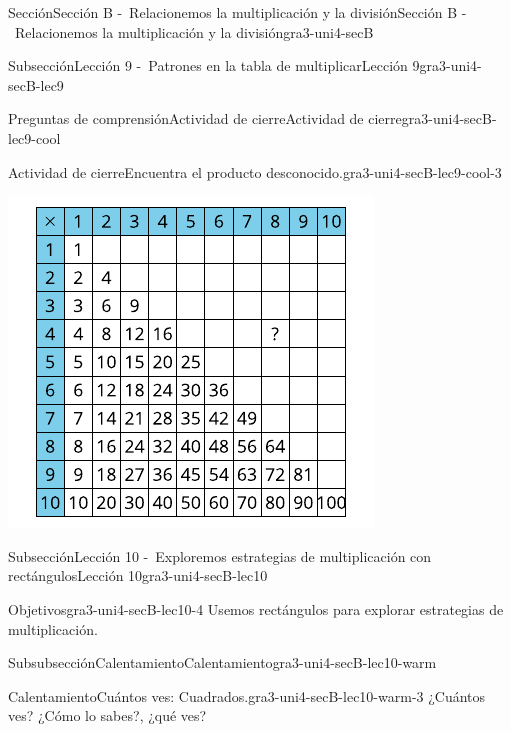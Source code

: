 \documentclass[twoside,10pt,]{article}
\begin{document}
\begin{sectionptx}{Sección}{Sección B -~Relacionemos la multiplicación y la división}{}{Sección B -~Relacionemos la multiplicación y la división}{}{}{gra3-uni4-secB}
\begin{subsectionptx}{Subsección}{Lección 9 -~Patrones en la tabla de multiplicar}{}{Lección 9}{}{}{gra3-uni4-secB-lec9}
\begin{reading-questions-subsubsection}{Preguntas de comprensión}{Actividad de cierre}{}{Actividad de cierre}{}{}{gra3-uni4-secB-lec9-cool}
\begin{project}{Actividad de cierre}{Encuentra el producto desconocido.}{gra3-uni4-secB-lec9-cool-3}
\begin{image}{0}{1}{0}{}
\includegraphics[width=\linewidth]{external/svg-source/tikz-file-153040.pdf}
\end{image}%
\end{project}%
\end{reading-questions-subsubsection}
\end{subsectionptx}
%
%
\typeout{************************************************}
\typeout{************************************************}
%
\begin{subsectionptx}{Subsección}{Lección 10 -~Exploremos estrategias de multiplicación con rectángulos}{}{Lección 10}{}{}{gra3-uni4-secB-lec10}
\begin{objectives}{Objetivos}{gra3-uni4-secB-lec10-4}
Usemos rectángulos para explorar estrategias de multiplicación.%
\end{objectives}
%
%
\typeout{************************************************}
\typeout{************************************************}
%
\begin{subsubsectionptx}{Subsubsección}{Calentamiento}{}{Calentamiento}{}{}{gra3-uni4-secB-lec10-warm}
\begin{exploration}{Calentamiento}{Cuántos ves: Cuadrados.}{gra3-uni4-secB-lec10-warm-3}%
¿Cuántos ves? ¿Cómo lo sabes?, ¿qué ves?%
\begin{image}{0}{1}{0}{}%

\end{image}
\end{exploration}
\end{subsubsectionptx}
\end{subsectionptx}
\end{sectionptx}
\end{document}
